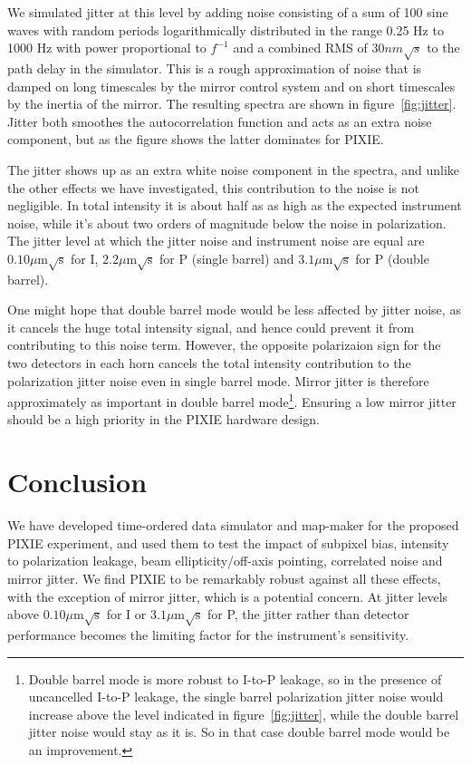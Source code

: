 \documentclass{article}
\begin{document}
We simulated jitter at this level by adding noise consisting of a
sum of 100 sine waves with random periods logarithmically distributed
in the range 0.25 Hz to 1000 Hz with power proportional to $f^{-1}$
and a combined RMS of $30 nm\sqrt{s}$ to the path delay in the simulator.
This is a rough approximation of noise that is damped on long timescales
by the mirror control system and on short timescales by the inertia of
the mirror. The resulting spectra are shown in figure~\ref{fig:jitter}.
Jitter both smoothes the autocorrelation function and acts as an extra
noise component, but as the figure shows the latter dominates for PIXIE.

The jitter shows up as an extra white noise component in the spectra,
and unlike the other effects we have investigated, this contribution to the
noise is not negligible. In total intensity it is about half as as high as
the expected instrument noise, while it's about two orders of magnitude
below the noise in polarization. The jitter level at which the jitter noise
and instrument noise are equal are $0.10 \mu\textrm{m}\sqrt{\textrm{s}}$
for I,  $2.2\mu\textrm{m}\sqrt{\textrm{s}}$ for P (single barrel) and
$3.1\mu\textrm{m}\sqrt{\textrm{s}}$ for P (double barrel).

One might hope that double barrel mode would
be less affected by jitter noise, as it cancels the huge total intensity signal, and hence
could prevent it from contributing to this noise term. However,
the opposite polarizaion sign for the two detectors in each horn cancels
the total intensity contribution to the polarization jitter noise even in
single barrel mode. Mirror jitter is therefore approximately as important in double
barrel mode\footnote{Double barrel mode is more robust to I-to-P leakage,
so in the presence of uncancelled I-to-P leakage, the single barrel polarization
jitter noise would increase above the level indicated in figure~\ref{fig:jitter},
while the double barrel jitter noise would stay as it is. So in that case double
barrel mode would be an improvement.}.
Ensuring a low mirror jitter should be a high
priority in the PIXIE hardware design.

\section{Conclusion}
We have developed time-ordered data simulator and map-maker for the proposed
PIXIE experiment,
and used them to test the impact of subpixel bias, intensity to
polarization leakage, beam ellipticity/off-axis pointing, correlated
noise and mirror jitter. We find PIXIE to be remarkably robust against
all these effects, with the exception of mirror jitter, which is a
potential concern. At jitter levels above $0.10 \mu\textrm{m}\sqrt{\textrm{s}}$
for I or $3.1\mu\textrm{m}\sqrt{\textrm{s}}$ for P, the jitter rather
than detector performance becomes the limiting factor for the instrument's sensitivity.
\end{document}
